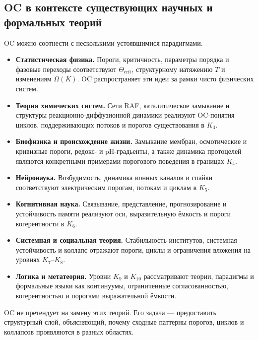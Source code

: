 \subsection{OC в контексте существующих научных и формальных теорий}

OC можно соотнести с несколькими устоявшимися парадигмами.

\begin{itemize}
    \item \textbf{Статистическая физика.}
          Пороги, критичность, параметры порядка и фазовые переходы соответствуют
          \(\Theta_{\mathrm{crit}}\), структурному натяжению \(T\) и изменениям
          \(\Omega(K)\). OC распространяет эти идеи за рамки чисто физических систем.
    \item \textbf{Теория химических систем.}
          Сети RAF, каталитическое замыкание и структуры реакционно-диффузионной
          динамики реализуют OC-понятия циклов, поддерживающих потоков и порогов
          существования в \(K_3\).
    \item \textbf{Биофизика и происхождение жизни.}
          Замыкание мембран, осмотические и кривизные пороги, редокс- и pH-градьенты,
          а также динамика протоцелей являются конкретными примерами порогового
          поведения в границах \(K_4\).
    \item \textbf{Нейронаука.}
          Возбудимость, динамика ионных каналов и спайки соответствуют электрическим
          порогам, потокам и циклам в \(K_5\).
    \item \textbf{Когнитивная наука.}
          Связывание, представление, прогнозирование и устойчивость памяти
          реализуют оси, выразительную ёмкость и пороги когерентности в \(K_6\).
    \item \textbf{Системная и социальная теория.}
          Стабильность институтов, системная устойчивость и коллапс отражают
          пороги, циклы и ограничения вложения на уровнях \(K_7\)–\(K_8\).
    \item \textbf{Логика и метатеория.}
          Уровни \(K_9\) и \(K_{10}\) рассматривают теории, парадигмы и формальные
          языки как континуумы, ограниченные согласованностью, когерентностью и
          порогами выражательной ёмкости.
\end{itemize}

OC не претендует на замену этих теорий.
Его задача — предоставить структурный слой, объясняющий, почему сходные паттерны
порогов, циклов и коллапсов проявляются в разных областях.

